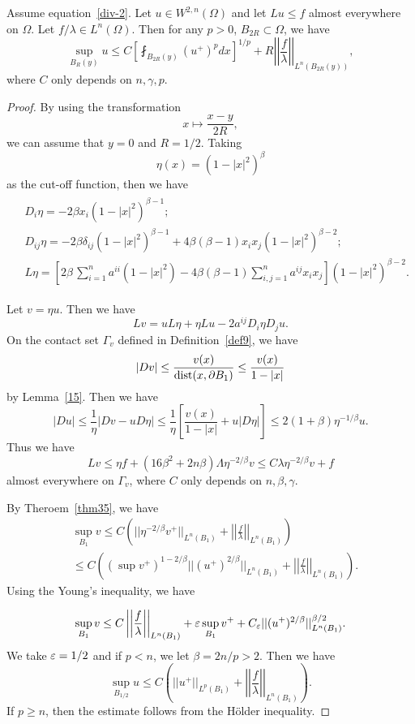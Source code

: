 \begin{theorem} Assume equation~\eqref{div-2}. Let $u\in W^{2,n}(\Omega)$ and let $Lu\leq f$ almost everywhere on $\Omega$. Let $f/\lambda\in L^n(\Omega)$. Then for any $p>0$, $B_{2R}\subset\Omega$, we have
\[
\sup_{B_R(y)} u\leq C\left[\fint_{B_{2R}(y)}(u^+)^p dx\right]^{1/p}+R\left|\left|\frac{f}{\lambda}\right|\right|_{L^n(B_{2R}(y))},
\]
where $C$ only depends on $n,\gamma,p$.
\end{theorem}

\begin{proof} By using the transformation
\[
x\mapsto\frac{x-y}{2R},
\]
we can assume that $y=0$ and $R=1/2$. Taking
\[
\eta(x)=(1-|x|^2)^\beta
\]
as the cut-off function, then we have
\begin{align}\label{26}
\begin{split}
& D_i\eta=-2\beta x_i(1-|x|^2)^{\beta-1};\\
&D_{ij}\eta=-2\beta\delta_{ij}(1-|x|^2)^{\beta-1}+4\beta(\beta-1)x_ix_j(1-|x|^2)^{\beta-2};\\
& L\eta=[2\beta\, \sum_{i=1}^na^{ii}(1-|x|^2)-4\beta(\beta-1)\sum_{i,j=1}^na^{ij}x_ix_j](1-|x|^2)^{\beta-2}.
\end{split}
\end{align}

Let $v=\eta u$. Then we have
\[
Lv=uL\eta+\eta Lu-2a^{ij} D_i\eta D_j u.
\]
On the contact set $\Gamma_v$ defined in Definition~\ref{def9}, we have
\[
|Dv|\leq\frac{v(x)}{{\rm dist}(x,\partial B_1)}\leq\frac{v(x)}{1-|x|}
\]
by Lemma~\ref{15}.
Then  we have
\[
|Du|\leq\frac1\eta|Dv-uD\eta|\leq\frac 1\eta\left[\frac{v(x)}{1-|x|}+u|D\eta|\right]\leq 2(1+\beta)
\eta^{-1/\beta} u.
\]
Thus we have
\[
Lv\leq\eta f+(16\beta^2+2n\beta)\Lambda\eta^{-2/\beta} v\leq C\lambda\eta^{-2/\beta} v+f
\]
almost everywhere on $\Gamma_v$, where $C$ only depends on $n,\beta,\gamma$.

By Theroem~\ref{thm35}, we have
\begin{align*}
&\sup _{B_1} v\leq  C\left(||\eta^{-2/\beta}v^+||_{L^n(B_1)}+\left|\left|\frac{f}{\lambda}\right|\right|_{L^n(B_1)}\right)\\
&\leq C\left((\sup v^+)^{1-2/\beta}||(u^+)^{2/\beta}||_{L^n(B_1)}+\left|\left|\frac{f}{\lambda}\right|\right|_{L^n(B_1)}\right).
\end{align*}
Using the Young's inequality, we have

\[
\sup_{B_1} v\leq C \left|\left|\frac{f}{\lambda}\right|\right|_{L^n(B_1)}+\varepsilon\sup_{B_1} v^++C_\varepsilon||(u^+)^{2/\beta}||^{\beta/2}_{L^n(B_1)}.
\]
We take $\varepsilon=1/2$ and if $p<n$, we let $\beta=2n/p>2$. Then we have
\[
\sup_{B_{1/2}} u\leq C\left(
||u^+||_{L^p(B_1)}+\left|\left|\frac{f}{\lambda}\right|\right|_{L^n(B_1)}\right).
\]
If $p\geq n$, then the estimate follows from the H\"older inequality.

\end{proof}

